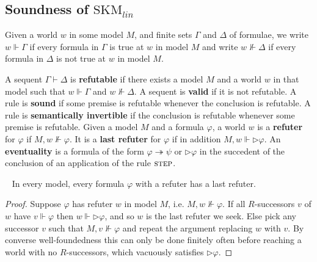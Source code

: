 \documentclass[envcountsect,envcountsame]{llncs}
\newcommand{\forces}{\Vdash}
\newcommand{\iimp}{\twoheadrightarrow}
\newcommand{\nxt}{\rhd}
\newcommand{\rel}{R}
\newcommand{\seq}{\vdash}
\newcommand{\seqlcnxt}{\mathrm{SKM}_{lin}}
\newcommand{\steprulename}{\textsc{step}}
\begin{document}
\subsection{Soundness of $\seqlcnxt$}

Given a world $w$ in some model $M$, and finite sets $\Gamma$ and
$\Delta$ of formulae, we write $w \forces \Gamma$ 
if every formula in $\Gamma$ is true at $w$ in model $M$ 
and write 
$w \not\forces \Delta$
if every formula in $\Delta$ is not true at $w$ in model $M$.

A sequent  $\Gamma \seq \Delta $ 
is \textbf{refutable} if there exists a model $M$ and a world $w$ in that
model such that
$w \forces \Gamma$
and $w \not\forces\Delta$.
A sequent  
is \textbf{valid} if it is not refutable.
A rule is \textbf{sound} 
if some premise is refutable whenever the conclusion is refutable.
A rule is \textbf{semantically invertible} 
if the conclusion is refutable whenever some premise is
refutable. 
Given a model $M$ and a formula $\varphi$, a world $w$ is a 
\textbf{refuter} 
for $\varphi$ if $M, w \not\forces \varphi$. It is a 
\textbf{last refuter} for $\varphi$ if in addition 
$M, w \forces \nxt\varphi$.
An \textbf{eventuality} is a formula of the form 
$\varphi\iimp\psi$  or
$\nxt\varphi$ in the succedent of the conclusion of an
application  of the rule 
$\steprulename$.

\begin{lemma}~\label{last-refuter}
  In every model, every formula $\varphi$ with a refuter has a last refuter.
\end{lemma}
\begin{proof}
Suppose $\varphi$ has refuter $w$ in model $M$, i.e.
$M, w \not\forces \varphi$.
If all $\rel$-successors $v$ of $w$ have $v\forces\varphi$ then
$w \forces \nxt\varphi$, and so $w$ is the last refuter we seek.
Else pick any successor $v$ such that $M, v \not\forces \varphi$
and repeat the argument replacing $w$ with $v$.
By converse well-foundedness this can only be done finitely often before
reaching a world with no $\rel$-successors, which vacuously satisfies
$\nxt\varphi$.
\end{proof}
\end{document}
